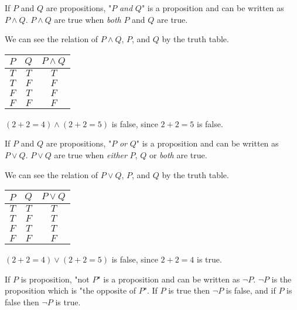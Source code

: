 \documentclass[a4paper]{article}
\begin{document}
\begin{defi}[And]
If $P$ and $Q$ are propositions, "$P$ \emph{and} $Q$" is a proposition and can be written as $P \land Q$. $P \land Q$ are true when \emph{both} $P$ and $Q$ are true.
\end{defi}

We can see the relation of $P \land Q$, $P$, and $Q$ by the truth table.

\begin{center}
	\begin{tabular}{|c|c|c|}
		\hline
		$P$ & $Q$ & $P \land Q$\\
		\hline
		$T$ & $T$ & $T$\\
		\hline
		$T$ & $F$ & $F$\\
		\hline
		$F$ & $T$ & $F$\\
		\hline
		$F$ & $F$ & $F$\\
		\hline
	\end{tabular}
\end{center}

\begin{eg}
$(2 + 2 = 4) \land (2 + 2 = 5)$ is false, since $2 + 2 = 5$ is false.
\end{eg}

\begin{defi}[Or]
If $P$ and $Q$ are propositions, "$P$ \emph{or} $Q$" is a proposition and can be written as $P \lor Q$. $P \lor Q$ are true when \emph{either} $P$, $Q$ or \emph{both} are true.
\end{defi}

We can see the relation of $P \lor Q$, $P$, and $Q$ by the truth table.

\begin{center}
	\begin{tabular}{|c|c|c|}
		\hline
		$P$ & $Q$ & $P \lor Q$\\
		\hline
		$T$ & $T$ & $T$\\
		\hline
		$T$ & $F$ & $T$\\
		\hline
		$F$ & $T$ & $T$\\
		\hline
		$F$ & $F$ & $F$\\
		\hline
	\end{tabular}
\end{center}

\begin{eg}
$(2 + 2 = 4) \lor (2 + 2 = 5)$ is false, since $2 + 2 = 4$ is true.
\end{eg}

\begin{defi}[Not]
If $P$ is proposition, "not $P$" is a proposition and can be written as $\neg P$. $\neg P$ is the proposition which is "the opposite of $P$". If $P$ is true then $\neg P$ is false, and if $P$ is false then $\neg P$ is true.
\end{defi}
\end{document}
